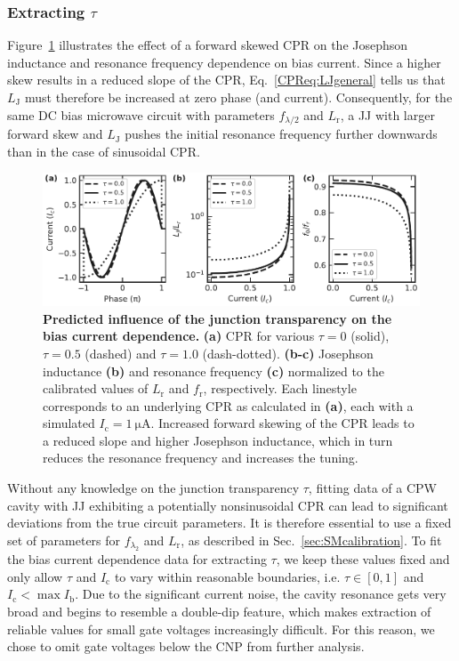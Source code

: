 \subsubsection{Extracting $\tau$}

Figure~\ref{CPRfig:SMinfluence} illustrates the effect of a forward skewed CPR on the Josephson inductance and resonance frequency dependence on bias current.
%
Since a higher skew results in a reduced slope of the CPR, Eq.~\ref{CPReq:LJgeneral} tells us that $L_\text{J}$ must therefore be increased at zero phase (and current).
%
Consequently, for the same DC bias microwave circuit with parameters $f_{\lambda/2}$ and $L_\text{r}$, a JJ with larger forward skew and $L_\text{J}$ pushes the initial resonance frequency further downwards than in the case of sinusoidal CPR.

\begin{figure}
	\centering
	\includegraphics[width=\linewidth]{chapter-gJJ-CPR/figs/SMFigure-influence}
	\caption{
		\textbf{Predicted influence of the junction transparency on the bias current dependence.}
		\textbf{(a)} CPR for various $\tau=0$ (solid), $\tau=0.5$ (dashed) and $\tau=1.0$	(dash-dotted).
		\textbf{(b-c)} Josephson inductance \textbf{(b)} and resonance frequency \textbf{(c)} normalized to the calibrated values of $L_\text{r}$ and $f_\text{r}$, respectively.
		Each linestyle corresponds to an underlying CPR as calculated in \textbf{(a)}, each with a simulated $I_\text{c}=\SI{1}{\micro\ampere}$.
		Increased forward skewing of the CPR leads to a reduced slope and higher Josephson inductance, which in turn reduces the resonance frequency and increases the tuning.
	}
	\label{CPRfig:SMinfluence}
\end{figure}

Without any knowledge on the junction transparency $\tau$, fitting data of a CPW cavity with JJ exhibiting a potentially nonsinusoidal CPR can lead to significant deviations from the true circuit parameters.
%
It is therefore essential to use a fixed set of parameters for $f_{\lambda_2}$ and $L_\text{r}$, as described in Sec.~\ref{sec:SMcalibration}.
%
To fit the bias current dependence data for extracting $\tau$, we keep these values fixed and only allow $\tau$ and $I_\text{c}$ to vary within reasonable boundaries, i.e. $\tau\in[0,1]$ and $I_\text{c}<\max I_\text{b}$.
%
Due to the significant current noise, the cavity resonance gets very broad and begins to resemble a double-dip feature, which makes extraction of reliable values for small gate voltages increasingly difficult.
%
For this reason, we chose to omit gate voltages below the CNP from further analysis.




